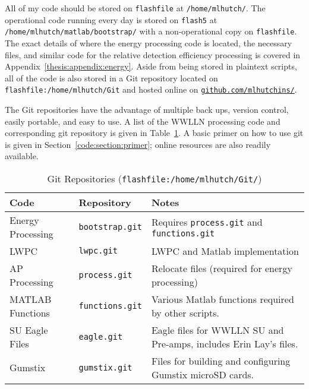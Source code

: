 All of my code should be stored on \texttt{flashfile} at \texttt{/home/mlhutch/}.
The operational code running every day is stored on \texttt{flash5} at \texttt{/home/mlhutch/matlab/bootstrap/} with a non-operational copy on \texttt{flashfile}.
The exact details of where the energy processing code is located, the necessary files, and similar code for the relative detection efficiency processing is covered in Appendix~\ref{thesis:appendix:energy}.
Aside from being stored in plaintext scripts, all of the code is also stored in a Git repository located on \texttt{flashfile:/home/mlhutch/Git} and hosted online on \href{http://github.com/mlhutchins}{\texttt{github.com/mlhutchins/}}.

The Git repositories have the advantage of multiple back ups, version control, easily portable, and easy to use.
A list of the WWLLN processing code and corresponding git repository is given in Table~\ref{code:table:repo}.
A basic primer on how to use git is given in Section~\ref{code:section:primer}; online resources are also readily available.

\begin{table}[h!]
\caption{Git Repositories (\texttt{flashfile:/home/mlhutch/Git/})}
\begin{center}
\begin{tabular}{|p{1.5in}|p{1in}|p{3in}|}

\hline
{\bf Code} &	{\bf Repository} &	{\bf Notes}\\

\hline
\rule{0pt}{3ex}
Energy Processing	&\texttt{bootstrap.git}	&	Requires \texttt{process.git} and \texttt{functions.git} \\ 

\hline
\rule{0pt}{3ex}
LWPC	&\texttt{lwpc.git}	&	LWPC and Matlab implementation\\ 

\hline
\rule{0pt}{3ex}
AP Processing	&\texttt{process.git}	&	Relocate files (required for energy processing)\\ 

\hline
\rule{0pt}{3ex}
MATLAB Functions	&\texttt{functions.git}	&	Various Matlab functions required by other scripts.\\ 

\hline
\rule{0pt}{3ex}
SU Eagle Files	&\texttt{eagle.git}	&	Eagle files for WWLLN SU and Pre-amps, includes Erin Lay's files.\\ 

\hline
\rule{0pt}{3ex}
Gumstix	&\texttt{gumstix.git}	&	Files for building and configuring Gumstix microSD cards.\\ 

\hline
\end{tabular}
\end{center}
\label{code:table:repo}
\end{table}

